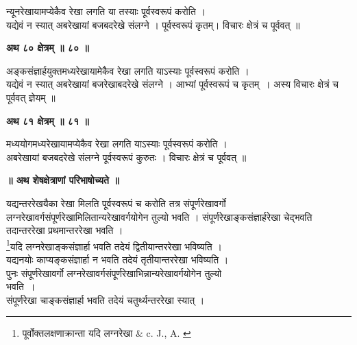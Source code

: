 \documentclass[11pt, openany]{book}
\begin{document}
{\ab न्यूनरेखायामप्येकैव रेखा लगति या तस्याः पूर्वस्वरूपं
करोति । }\\

यद्येवं न स्यात् अबरेखायां बजबदरेखे संलग्ने । पूर्वस्वरूपं
कृतम्। विचारः क्षेत्रं च पूर्ववत् ॥ 


\newpage
\begin{center}
\textbf{\large अथ ८० क्षेत्रम् ॥ ८० ॥}
\end{center} 
\vspace{2mm} 


{\ab अङ्कसंज्ञार्हयुक्तमध्यरेखायामेकैव रेखा लगति याऽस्याः
पूर्वस्वरूपं करोति । }\\

 यद्येवं न स्यात् अबरेखायां बजरेखाबदरेखे संलग्ने । आभ्यां
पूर्वस्वरूपं च कृतम्~। अस्य विचारः क्षेत्रं च पूर्ववत् ज्ञेयम् ॥ \\

\begin{center}
\textbf{\large अथ ८१ क्षेत्रम् ॥ ८१ ॥}
\end{center}
\vspace{2mm}

{\ab मध्ययोगमध्यरेखायामप्येकैव रेखा लगति याऽस्याः पूर्वस्वरूपं करोति । }\\

 अबरेखायां बजबदरेखे संलग्ने पूर्वस्वरूपं कुरुतः । विचारः
क्षेत्रं च पूर्ववत् ॥ \\
\begin{center}
\textbf{ ॥ अथ शेषक्षेत्राणां परिभाषोच्यते ॥ }
\end{center}
\vspace{5mm}

 यद्यन्तररेखयैका रेखा मिलति पूर्वस्वरूपं च करोति तत्र संपूर्णरेखावर्गो लग्नरेखावर्गसंपूर्णरेखामिलितान्यरेखावर्गयोगेन तुल्यो भवति ।
संपूर्णरेखाङ्कसंज्ञार्हरेखा चेद्भवति तदान्तररेखा प्रथमान्तररेखा भवति ।\\

\renewcommand{\thefootnote}{१}\footnote{पूर्वोक्तलक्षणाक्रान्ता यदि लग्नरेखा {\en \& c. J., A. }}यदि लग्नरेखाङ्कसंज्ञार्हा भवति तदेयं द्वितीयान्तररेखा भविष्यति ।\\

यद्यनयोः काप्यङ्कसंज्ञार्हा न भवति तदेयं तृतीयान्तररेखा
भविष्यति । \\

 पुनः संपूर्णरेखावर्गो लग्नरेखावर्गसंपूर्णरेखाभिन्नान्यरेखावर्गयोगेन
तुल्यो \\ \noindent भवति~। \\

 संपूर्णरेखा चाङ्कसंज्ञार्हा भवति तदेयं चतुर्थ्यन्तररेखा स्यात् ।\\
 
\end{document}
